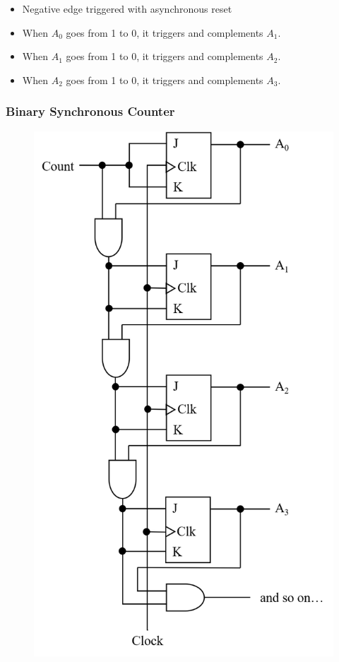\documentclass[a4paper]{article}
\begin{document}
\begin{minipage}[t]{0.6\textwidth}
\begin{itemize}
    \item Negative edge triggered with asynchronous reset
    \mbox{}\\
    \item When $A_0$ goes from 1 to 0, it triggers and complements $A_1$.
    \item When $A_1$ goes from 1 to 0, it triggers and complements $A_2$.
    \item When $A_2$ goes from 1 to 0, it triggers and complements $A_3$.
\end{itemize}
\end{minipage}

\subsubsection{Binary Synchronous Counter}
\begin{minipage}[t]{0.45\textwidth}
\begin{figure}[H]
    \centering
    \includegraphics[width=\textwidth]{bin-sync-counter.png}
\end{figure}
\end{minipage}
\end{document}
